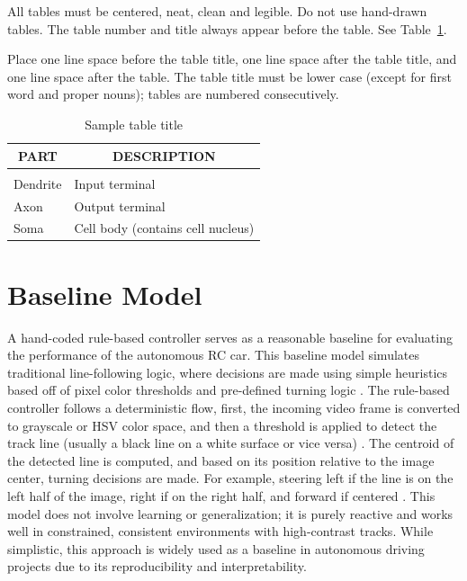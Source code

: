 \documentclass{article} %
\begin{document}
All tables must be centered, neat, clean and legible. Do not use hand-drawn
tables. The table number and title always appear before the table. See
Table~\ref{sample-table}.

Place one line space before the table title, one line space after the table
title, and one line space after the table. The table title must be lower case
(except for first word and proper nouns); tables are numbered consecutively.

\begin{table}[t]
\caption{Sample table title}
\label{sample-table}
\begin{center}
\begin{tabular}{ll}
\multicolumn{1}{c}{\bf PART}  &\multicolumn{1}{c}{\bf DESCRIPTION}
\\ \hline \\
Dendrite         &Input terminal \\
Axon             &Output terminal \\
Soma             &Cell body (contains cell nucleus) \\
\end{tabular}
\end{center}
\end{table}



\section{Baseline Model}

A hand-coded rule-based controller serves as a reasonable baseline for evaluating the performance of the autonomous RC car. 
This baseline model simulates traditional line-following logic, where decisions are made using simple heuristics based off of 
pixel color thresholds and pre-defined turning logic \citep{LIKMETA2020103568}. The rule-based controller follows a deterministic flow, first, the incoming 
video frame is converted to grayscale or HSV color space, and then a threshold is applied to detect the track line (usually a black line 
on a white surface or vice versa) \citep{LIKMETA2020103568}. The centroid of the detected line is computed, and based on its position relative to the image center, 
turning decisions are made. For example, steering left if the line is on the left half of the image, right if on the right half, and forward if 
centered \citep{bojarski2016endendlearningselfdriving}. This model does not involve learning or generalization; it is purely reactive and works well in constrained, consistent environments 
with high-contrast tracks. While simplistic, this approach is widely used as a baseline in autonomous driving projects due to its reproducibility 
and interpretability.
\end{document}
